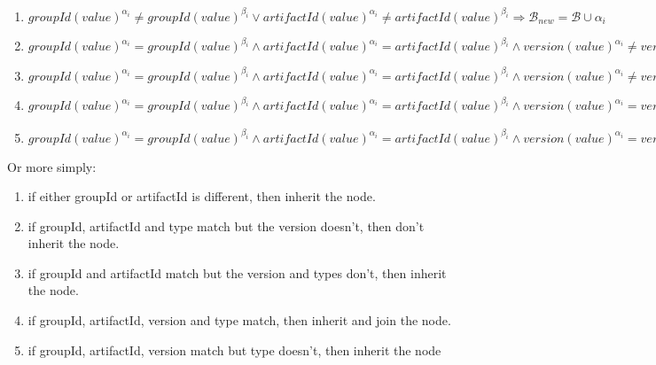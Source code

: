 \documentclass[12pt]{amsart}
\begin{document}
\begin{enumerate}
\item
\begin{math}
groupId(value)^{\alpha_i} \neq groupId(value)^{\beta_i} \vee artifactId(value)^{\alpha_i} \neq artifactId(value)^{\beta_i}  \Rightarrow \mathcal{B}_{new} = \mathcal{B} \cup \alpha_i 
\end{math}
\item
\begin{math}
groupId(value)^{\alpha_i} = groupId(value)^{\beta_i}  \wedge artifactId(value)^{\alpha_i} = artifactId(value)^{\beta_i}  \wedge version(value)^{\alpha_i} \neq version(value)^{\beta_i}  \wedge  type(value)^{\alpha_i} = type(value)^{\beta_i} \Rightarrow \mathcal{B}_{new} = \mathcal{B} - \alpha_i 
\end{math}
\item
\begin{math}
groupId(value)^{\alpha_i} = groupId(value)^{\beta_i}  \wedge artifactId(value)^{\alpha_i} = artifactId(value)^{\beta_i}  \wedge version(value)^{\alpha_i} \neq version(value)^{\beta_i}  \wedge  type(value)^{\alpha_i} \neq type(value)^{\beta_i} \Rightarrow \mathcal{B}_{new} = \mathcal{B} \cup \alpha_i 
\end{math}
\item
\begin{math}
groupId(value)^{\alpha_i} = groupId(value)^{\beta_i}  \wedge artifactId(value)^{\alpha_i} = artifactId(value)^{\beta_i}  \wedge version(value)^{\alpha_i} = version(value)^{\beta_i}  \wedge type(value)^{\alpha_i} = type(value)^{\beta_i} \Rightarrow \mathcal{B}_{new} = \mathcal{B} \cup \alpha_i - (\alpha_i \cap \beta_i)
\end{math}
\item
\begin{math}
groupId(value)^{\alpha_i} = groupId(value)^{\beta_i}  \wedge artifactId(value)^{\alpha_i} = artifactId(value)^{\beta_i}  \wedge version(value)^{\alpha_i} = version(value)^{\beta_i}  \wedge type(value)^{\alpha_i} \neq type(value)^{\beta_i} \Rightarrow \mathcal{B}_{new} = \mathcal{B} \cup \alpha_i 
\end{math}

\end{enumerate}

Or more simply:

\begin{enumerate}
\item if either groupId or artifactId is different, then inherit the node.
\item if groupId, artifactId and type match but the version doesn't, then don't inherit the node.
\item if groupId and artifactId  match but the version and types don't, then inherit the node.
\item if groupId, artifactId, version and type match, then inherit and join the node.
\item if groupId, artifactId, version match but type doesn't, then inherit the node
\end{enumerate}
\end{document}
